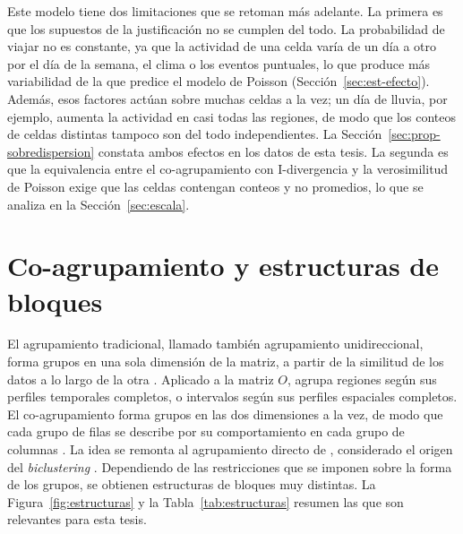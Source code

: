 Este modelo tiene dos limitaciones que se retoman más adelante. La primera es que
los supuestos de la justificación no se cumplen del todo. La probabilidad de
viajar no es constante, ya que la actividad de una celda varía de un día a otro por el
día de la semana, el clima o los eventos puntuales, lo que produce más
variabilidad de la que predice el modelo de Poisson
(Sección~\ref{sec:est-efecto}). Además, esos factores actúan sobre muchas celdas
a la vez; un día de lluvia, por ejemplo, aumenta la actividad en casi todas las
regiones, de modo que los conteos de celdas distintas tampoco son del todo
independientes. La Sección~\ref{sec:prop-sobredispersion} constata ambos efectos
en los datos de esta tesis. La segunda es que la equivalencia entre el
co-agrupamiento con I-divergencia y la verosimilitud de Poisson exige que las
celdas contengan conteos y no promedios, lo que se analiza en la
Sección~\ref{sec:escala}.

\section{Co-agrupamiento y estructuras de bloques}\label{sec:estructuras}

El agrupamiento tradicional, llamado también agrupamiento unidireccional, forma
grupos en una sola dimensión de la matriz, a partir de la similitud de los datos a
lo largo de la otra \citep{Wu2020}. Aplicado a la matriz $O$, agrupa regiones según
sus perfiles temporales completos, o intervalos según sus perfiles espaciales
completos. El co-agrupamiento forma grupos en las dos dimensiones a la vez,
de modo que cada grupo de filas se describe por su comportamiento en cada grupo de
columnas \citep{Wu2020}. La idea se remonta al agrupamiento directo de
\citet{Hartigan1972}, considerado el origen del \emph{biclustering} \citep{Castanho2024}.
Dependiendo de las restricciones que se imponen sobre la forma de los grupos, se
obtienen estructuras de bloques muy distintas. La
Figura~\ref{fig:estructuras} y la Tabla~\ref{tab:estructuras} resumen las que son
relevantes para esta tesis.

